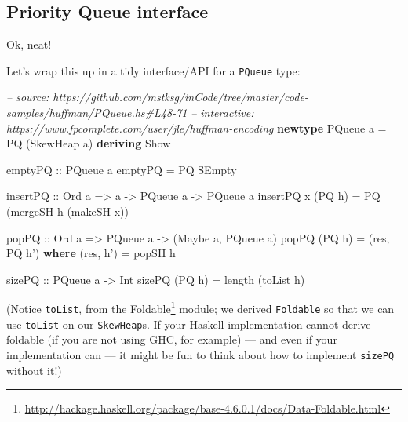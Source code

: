 \documentclass[]{article}
\newenvironment{Shaded}{}{}
\newcommand{\KeywordTok}[1]{\textcolor[rgb]{0.00,0.44,0.13}{\textbf{{#1}}}}
\newcommand{\DataTypeTok}[1]{\textcolor[rgb]{0.56,0.13,0.00}{{#1}}}
\newcommand{\CommentTok}[1]{\textcolor[rgb]{0.38,0.63,0.69}{\textit{{#1}}}}
\newcommand{\OtherTok}[1]{\textcolor[rgb]{0.00,0.44,0.13}{{#1}}}
\newcommand{\FunctionTok}[1]{\textcolor[rgb]{0.02,0.16,0.49}{{#1}}}
\newcommand{\NormalTok}[1]{{#1}}
\renewcommand{\href}[2]{#2\footnote{\url{#1}}}
\begin{document}
\subsection{Priority Queue interface}\label{priority-queue-interface}

Ok, neat!

Let's wrap this up in a tidy interface/API for a \texttt{PQueue} type:

\begin{Shaded}
\begin{Highlighting}[]
\CommentTok{-- source: https://github.com/mstksg/inCode/tree/master/code-samples/huffman/PQueue.hs#L48-71}
\CommentTok{-- interactive: https://www.fpcomplete.com/user/jle/huffman-encoding}
\KeywordTok{newtype} \DataTypeTok{PQueue} \NormalTok{a }\FunctionTok{=} \DataTypeTok{PQ} \NormalTok{(}\DataTypeTok{SkewHeap} \NormalTok{a) }\KeywordTok{deriving} \DataTypeTok{Show}

\OtherTok{emptyPQ ::} \DataTypeTok{PQueue} \NormalTok{a}
\NormalTok{emptyPQ }\FunctionTok{=} \DataTypeTok{PQ} \DataTypeTok{SEmpty}

\OtherTok{insertPQ ::} \DataTypeTok{Ord} \NormalTok{a }\OtherTok{=>} \NormalTok{a }\OtherTok{->} \DataTypeTok{PQueue} \NormalTok{a }\OtherTok{->} \DataTypeTok{PQueue} \NormalTok{a}
\NormalTok{insertPQ x (}\DataTypeTok{PQ} \NormalTok{h) }\FunctionTok{=} \DataTypeTok{PQ} \NormalTok{(mergeSH h (makeSH x))}

\OtherTok{popPQ ::} \DataTypeTok{Ord} \NormalTok{a }\OtherTok{=>} \DataTypeTok{PQueue} \NormalTok{a }\OtherTok{->} \NormalTok{(}\DataTypeTok{Maybe} \NormalTok{a, }\DataTypeTok{PQueue} \NormalTok{a)}
\NormalTok{popPQ (}\DataTypeTok{PQ} \NormalTok{h) }\FunctionTok{=} \NormalTok{(res, }\DataTypeTok{PQ} \NormalTok{h')}
  \KeywordTok{where}
    \NormalTok{(res, h') }\FunctionTok{=} \NormalTok{popSH h}

\OtherTok{sizePQ ::} \DataTypeTok{PQueue} \NormalTok{a }\OtherTok{->} \DataTypeTok{Int}
\NormalTok{sizePQ (}\DataTypeTok{PQ} \NormalTok{h) }\FunctionTok{=} \NormalTok{length (toList h)}
\end{Highlighting}
\end{Shaded}

(Notice \texttt{toList}, from the
\href{http://hackage.haskell.org/package/base-4.6.0.1/docs/Data-Foldable.html}{Foldable}
module; we derived \texttt{Foldable} so that we can use \texttt{toList} on our
\texttt{SkewHeap}s. If your Haskell implementation cannot derive foldable (if
you are not using GHC, for example) --- and even if your implementation can ---
it might be fun to think about how to implement \texttt{sizePQ} without it!)
\end{document}
